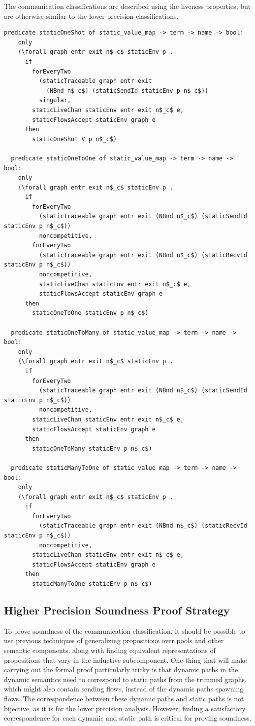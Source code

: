 \documentclass[10pt]{article}
\begin{document}
The communication classifications are described using the liveness properties, but
are otherwise similar to the lower precision classifications.

\begin{lstlisting}[language=logic, mathescape]
  predicate staticOneShot of static_value_map -> term -> name -> bool:
    only
    (\forall graph entr exit n$_c$ staticEnv p . 
      if
        forEveryTwo
          (staticTraceable graph entr exit
            (NBnd n$_c$) (staticSendId staticEnv p n$_c$))
          singular, 
        staticLiveChan staticEnv entr exit n$_c$ e, 
        staticFlowsAccept staticEnv graph e
      then
        staticOneShot V p n$_c$)

  predicate staticOneToOne of static_value_map -> term -> name -> bool:
    only
    (\forall graph entr exit n$_c$ staticEnv p .
      if
        forEveryTwo
          (staticTraceable graph entr exit (NBnd n$_c$) (staticSendId staticEnv p n$_c$))
          noncompetitive, 
        forEveryTwo
          (staticTraceable graph entr exit (NBnd n$_c$) (staticRecvId staticEnv p n$_c$))
          noncompetitive,
          staticLiveChan staticEnv entr exit n$_c$ e,
          staticFlowsAccept staticEnv graph e
      then
        staticOneToOne staticEnv p n$_c$)

  predicate staticOneToMany of static_value_map -> term -> name -> bool:
    only
    (\forall graph entr exit n$_c$ staticEnv p .
      if
        forEveryTwo
          (staticTraceable graph entr exit (NBnd n$_c$) (staticSendId staticEnv p n$_c$))
          noncompetitive,
        staticLiveChan staticEnv entr exit n$_c$ e,
        staticFlowsAccept staticEnv graph e
      then
        staticOneToMany staticEnv p n$_c$)

  predicate staticManyToOne of static_value_map -> term -> name -> bool:
    only
    (\forall graph entr exit n$_c$ staticEnv p .
      if
        forEveryTwo
          (staticTraceable graph entr exit (NBnd n$_c$) (staticRecvId staticEnv p n$_c$))
          noncompetitive, 
        staticLiveChan staticEnv entr exit n$_c$ e,
        staticFlowsAccept staticEnv graph e
      then
        staticManyToOne staticEnv p n$_c$)
  \end{lstlisting}


\subsection{Higher Precision Soundness Proof Strategy}
To prove soundness of the communication classification, it should be possible to use
previous techniques of generalizing propositions over pools and other semantic components,
along with finding equivalent representations of propositions that vary in the inductive
subcomponent. One thing that will make carrying out the formal proof particularly tricky is
that dynamic paths in the dynamic semantics need to correspond to static paths from
the trimmed graphs, which might also contain sending flows,
instead of the dynamic paths spawning flows.
The correspondence between these dynamic paths and static paths
is not bijective, as it is for the lower precision analysis. However, finding a satisfactory
correspondence for each dynamic and static path is critical for proving soundness.
\end{document}
